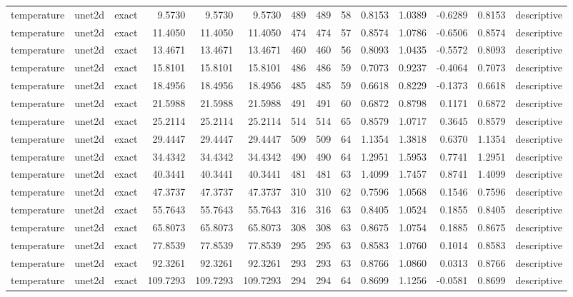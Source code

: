 \begin{tabular}{lllrrrrrrrrrrl}
temperature & unet2d & exact & 9.5730 & 9.5730 & 9.5730 & 489 & 489 & 58 & 0.8153 & 1.0389 & -0.6289 & 0.8153 & descriptive \\
temperature & unet2d & exact & 11.4050 & 11.4050 & 11.4050 & 474 & 474 & 57 & 0.8574 & 1.0786 & -0.6506 & 0.8574 & descriptive \\
temperature & unet2d & exact & 13.4671 & 13.4671 & 13.4671 & 460 & 460 & 56 & 0.8093 & 1.0435 & -0.5572 & 0.8093 & descriptive \\
temperature & unet2d & exact & 15.8101 & 15.8101 & 15.8101 & 486 & 486 & 59 & 0.7073 & 0.9237 & -0.4064 & 0.7073 & descriptive \\
temperature & unet2d & exact & 18.4956 & 18.4956 & 18.4956 & 485 & 485 & 59 & 0.6618 & 0.8229 & -0.1373 & 0.6618 & descriptive \\
temperature & unet2d & exact & 21.5988 & 21.5988 & 21.5988 & 491 & 491 & 60 & 0.6872 & 0.8798 & 0.1171 & 0.6872 & descriptive \\
temperature & unet2d & exact & 25.2114 & 25.2114 & 25.2114 & 514 & 514 & 65 & 0.8579 & 1.0717 & 0.3645 & 0.8579 & descriptive \\
temperature & unet2d & exact & 29.4447 & 29.4447 & 29.4447 & 509 & 509 & 64 & 1.1354 & 1.3818 & 0.6370 & 1.1354 & descriptive \\
temperature & unet2d & exact & 34.4342 & 34.4342 & 34.4342 & 490 & 490 & 64 & 1.2951 & 1.5953 & 0.7741 & 1.2951 & descriptive \\
temperature & unet2d & exact & 40.3441 & 40.3441 & 40.3441 & 481 & 481 & 63 & 1.4099 & 1.7457 & 0.8741 & 1.4099 & descriptive \\
temperature & unet2d & exact & 47.3737 & 47.3737 & 47.3737 & 310 & 310 & 62 & 0.7596 & 1.0568 & 0.1546 & 0.7596 & descriptive \\
temperature & unet2d & exact & 55.7643 & 55.7643 & 55.7643 & 316 & 316 & 63 & 0.8405 & 1.0524 & 0.1855 & 0.8405 & descriptive \\
temperature & unet2d & exact & 65.8073 & 65.8073 & 65.8073 & 308 & 308 & 63 & 0.8675 & 1.0754 & 0.1885 & 0.8675 & descriptive \\
temperature & unet2d & exact & 77.8539 & 77.8539 & 77.8539 & 295 & 295 & 63 & 0.8583 & 1.0760 & 0.1014 & 0.8583 & descriptive \\
temperature & unet2d & exact & 92.3261 & 92.3261 & 92.3261 & 293 & 293 & 63 & 0.8766 & 1.0860 & 0.0313 & 0.8766 & descriptive \\
temperature & unet2d & exact & 109.7293 & 109.7293 & 109.7293 & 294 & 294 & 64 & 0.8699 & 1.1256 & -0.0581 & 0.8699 & descriptive \\

\end{tabular}
